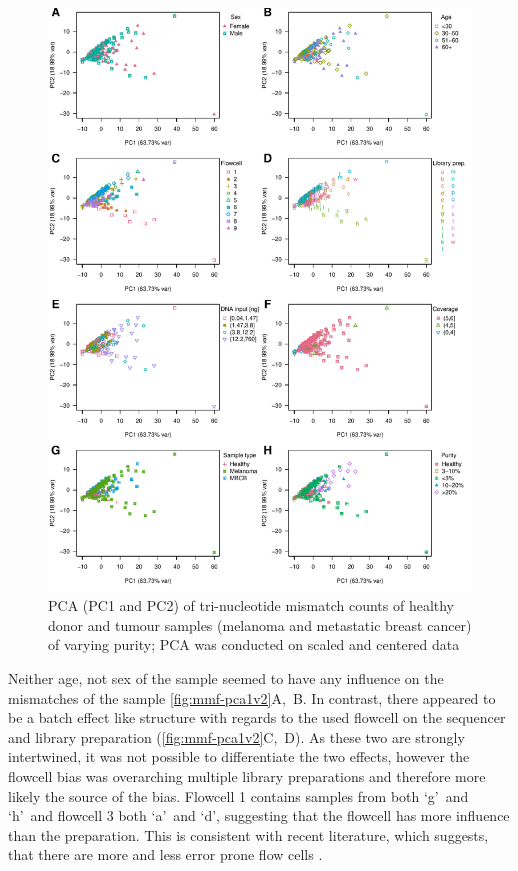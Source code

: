 \begin{figure}[!ht]
\centering
\includegraphics[width=.99\linewidth]{Figures/MisMatchFinder/countPCAsPC1vsPC2.pdf}
\caption[PCA of tri-nucleotide mismatch counts of real world data (PC1 and PC2)]{PCA (PC1 and PC2) of tri-nucleotide mismatch counts of healthy donor and tumour samples (melanoma and metastatic breast cancer) of varying purity; PCA was conducted on scaled and centered data}\label{fig:mmf-pca1v2}
\end{figure}


Neither age, not sex of the sample seemed to have any influence on the mismatches of the sample \autoref{fig:mmf-pca1v2}A,~B. In contrast, there appeared to be a batch effect like structure with regards to the used flowcell on the sequencer and library preparation (\autoref{fig:mmf-pca1v2}C,~D). As these two are strongly intertwined, it was not possible to differentiate the two effects, however the flowcell bias was overarching multiple library preparations and therefore more likely the source of the bias. Flowcell 1 contains samples from both \lq g\rq\ and \lq h\rq\ and  flowcell 3 both \lq a\rq\ and \lq d\rq, suggesting that the flowcell has more influence than the preparation. This is consistent with recent literature, which suggests, that there are more and less error prone flow cells \cite{Stoler2021}.

